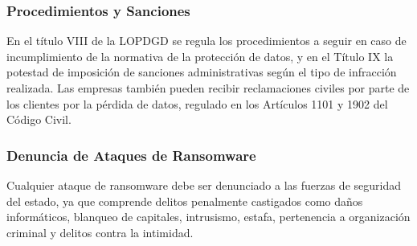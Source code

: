 \subsubsection{Procedimientos y Sanciones}

En el título VIII de la LOPDGD se regula los procedimientos a seguir en caso de incumplimiento de la normativa de la protección de datos, y en el Título IX la potestad de imposición de sanciones administrativas según el tipo de infracción realizada. Las empresas también pueden recibir reclamaciones civiles por parte de los clientes por la pérdida de datos, regulado en los Artículos 1101 y 1902 del Código Civil.

\subsubsection{Denuncia de Ataques de Ransomware}

Cualquier ataque de ransomware debe ser denunciado a las fuerzas de seguridad del estado, ya que comprende delitos penalmente castigados como daños informáticos, blanqueo de capitales, intrusismo, estafa, pertenencia a organización criminal y delitos contra la intimidad.
